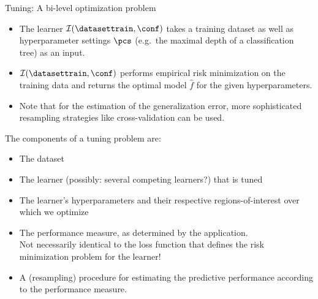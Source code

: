 \begin{frame}{Tuning: A bi-level optimization problem}
\begin{itemize}
\item The learner $\inducer(\datasettrain, \conf)$ takes a training dataset as well as hyperparameter settings $\pcs$ (e.g.\ the maximal depth of a classification tree) as an input.
\item $\inducer(\datasettrain, \conf)$ performs empirical risk minimization on the training data and returns the optimal model $\hat f$ for the given hyperparameters.
\item Note that for the estimation of the generalization error, more sophisticated resampling strategies like cross-validation can be used.
\end{itemize}

\framebreak

The components of a tuning problem are:

\begin{itemize}
\item The dataset
\item The learner (possibly: several competing learners?) that is tuned %
\item The learner's hyperparameters and their respective regions-of-interest over which we optimize %
\item The performance measure, as determined by the application.\\ Not necessarily identical to the loss function that defines the risk minimization problem for the learner!\\
\item A (resampling) procedure for estimating the predictive performance according to the performance measure.
\end{itemize}



\end{frame}

